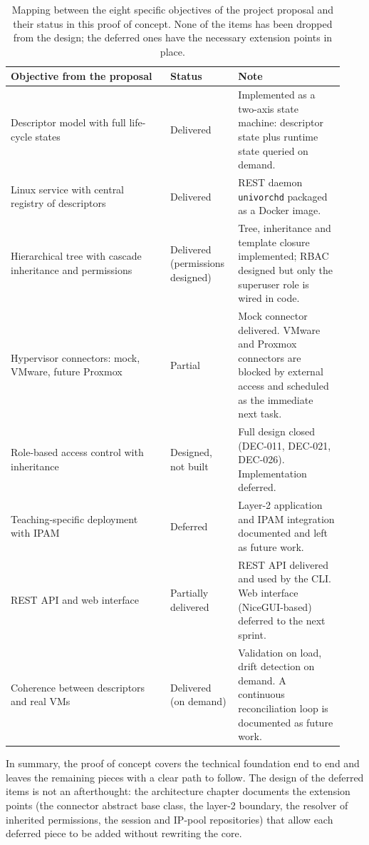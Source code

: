 \begin{table}[ht]
  \centering
  \small
  \begin{tabular}{p{0.45\linewidth} p{0.18\linewidth} p{0.30\linewidth}}
    \toprule
    \textbf{Objective from the proposal} & \textbf{Status} & \textbf{Note} \\
    \midrule
    Descriptor model with full life-cycle states &
    Delivered &
    Implemented as a two-axis state machine: descriptor state plus
    runtime state queried on demand. \\
    Linux service with central registry of descriptors &
    Delivered &
    REST daemon \texttt{univorchd} packaged as a Docker image. \\
    Hierarchical tree with cascade inheritance and permissions &
    Delivered (permissions designed) &
    Tree, inheritance and template closure implemented; RBAC designed
    but only the superuser role is wired in code. \\
    Hypervisor connectors: mock, VMware, future Proxmox &
    Partial &
    Mock connector delivered. VMware and Proxmox connectors are
    blocked by external access and scheduled as the immediate next
    task. \\
    Role-based access control with inheritance &
    Designed, not built &
    Full design closed (DEC-011, DEC-021, DEC-026). Implementation
    deferred. \\
    Teaching-specific deployment with IPAM &
    Deferred &
    Layer-2 application and IPAM integration documented and left as
    future work. \\
    REST API and web interface &
    Partially delivered &
    REST API delivered and used by the CLI. Web interface
    (NiceGUI-based) deferred to the next sprint. \\
    Coherence between descriptors and real VMs &
    Delivered (on demand) &
    Validation on load, drift detection on demand. A continuous
    reconciliation loop is documented as future work. \\
    \bottomrule
  \end{tabular}
  \caption{Mapping between the eight specific objectives of the
    project proposal and their status in this proof of concept. None
    of the items has been dropped from the design; the deferred ones
    have the necessary extension points in place.}
  \label{tab:adjustments}
\end{table}

In summary, the proof of concept covers the technical foundation end
to end and leaves the remaining pieces with a clear path to follow.
The design of the deferred items is not an afterthought: the
architecture chapter documents the extension points (the connector
abstract base class, the layer-2 boundary, the resolver of inherited
permissions, the session and IP-pool repositories) that allow each
deferred piece to be added without rewriting the core.

